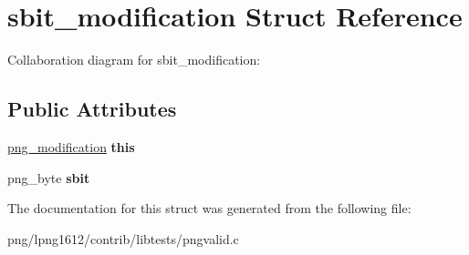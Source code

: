 \hypertarget{structsbit__modification}{\section{sbit\+\_\+modification Struct Reference}
\label{structsbit__modification}
}


Collaboration diagram for sbit\+\_\+modification\+:
\subsection*{Public Attributes}
\begin{DoxyCompactItemize}
\item 
\hypertarget{structsbit__modification_aa03c09b2626f52109014d3208f049d16}{\hyperlink{structpng__modification}{png\+\_\+modification} {\bfseries this}}\label{structsbit__modification_aa03c09b2626f52109014d3208f049d16}

\item 
\hypertarget{structsbit__modification_a59746411ceb01dd39d0f422495806874}{png\+\_\+byte {\bfseries sbit}}\label{structsbit__modification_a59746411ceb01dd39d0f422495806874}

\end{DoxyCompactItemize}


The documentation for this struct was generated from the following file\+:\begin{DoxyCompactItemize}
\item 
png/lpng1612/contrib/libtests/pngvalid.\+c\end{DoxyCompactItemize}
